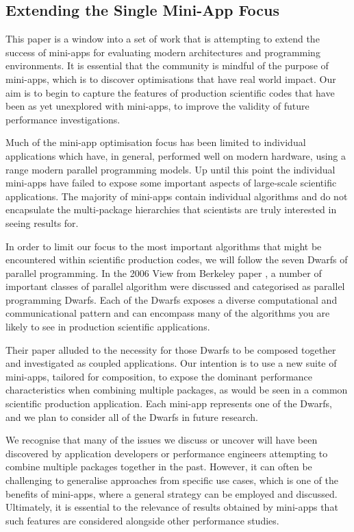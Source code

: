 \documentclass[runningheads,a4paper]{llncs}
\begin{document}
\subsection{Extending the Single Mini-App Focus}

This paper is a window into a set of work that is attempting to extend the success of mini-apps for evaluating modern architectures and programming environments. It is essential that the community is mindful of the purpose of mini-apps, which is to discover optimisations that have real world impact. Our aim is to begin to capture the features of production scientific codes that have been as yet unexplored with mini-apps, to improve the validity of future performance investigations. 

Much of the mini-app optimisation focus has been limited to individual applications which have, in general, performed well on modern hardware, using a range modern parallel programming models. Up until this point the individual mini-apps have failed to expose some important aspects of large-scale scientific applications. The majority of mini-apps contain individual algorithms and do not encapsulate the multi-package hierarchies that scientists are truly interested in seeing results for.

In order to limit our focus to the most important algorithms that might be encountered within scientific production codes, we will follow the seven Dwarfs of parallel programming. In the 2006 View from Berkeley paper \cite{Asanovic2006}, a number of important classes of parallel algorithm were discussed and categorised as parallel programming Dwarfs. Each of the Dwarfs exposes a diverse computational and communicational pattern and can encompass many of the algorithms you are likely to see in production scientific applications.  

Their paper alluded to the necessity for those Dwarfs to be composed together and investigated as coupled applications. Our intention is to use a new suite of mini-apps, tailored for composition, to expose the dominant performance characteristics when combining multiple packages, as would be seen in a common scientific production application. Each mini-app represents one of the Dwarfs, and we plan to consider all of the Dwarfs in future research.

We recognise that many of the issues we discuss or uncover will have been discovered by application developers or performance engineers attempting to combine multiple packages together in the past. However, it can often be challenging to generalise approaches from specific use cases, which is one of the benefits of mini-apps, where a general strategy can be employed and discussed. Ultimately, it is essential to the relevance of results obtained by mini-apps that such features are considered alongside other performance studies. 
\end{document}
